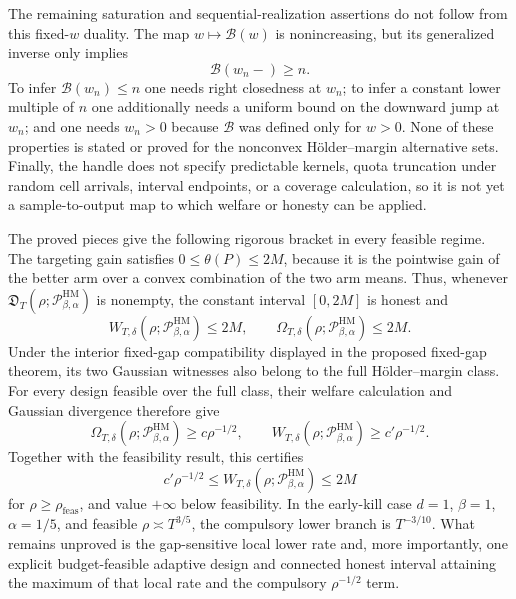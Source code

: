 The remaining saturation and sequential-realization assertions do not follow from this fixed-\(w\) duality.  The map \(w\mapsto\mathcal B(w)\) is nonincreasing, but its generalized inverse only implies
\[
\mathcal B(w_n-)\geq n.
\]
To infer \(\mathcal B(w_n)\leq n\) one needs right closedness at \(w_n\); to infer a constant lower multiple of \(n\) one additionally needs a uniform bound on the downward jump at \(w_n\); and one needs \(w_n>0\) because \(\mathcal B\) was defined only for \(w>0\).  None of these properties is stated or proved for the nonconvex H\"older--margin alternative sets.  Finally, the handle does not specify predictable kernels, quota truncation under random cell arrivals, interval endpoints, or a coverage calculation, so it is not yet a sample-to-output map to which welfare or honesty can be applied.

The proved pieces give the following rigorous bracket in every feasible regime.  The targeting gain satisfies \(0\leq\theta(P)\leq2M\), because it is the pointwise gain of the better arm over a convex combination of the two arm means.  Thus, whenever \(\mathfrak D_T(\rho;\mathcal P_{\beta,\alpha}^{\mathrm{HM}})\) is nonempty, the constant interval \([0,2M]\) is honest and
\[
W_{T,\delta}(\rho;\mathcal P_{\beta,\alpha}^{\mathrm{HM}})\leq2M,
\qquad
\Omega_{T,\delta}(\rho;\mathcal P_{\beta,\alpha}^{\mathrm{HM}})\leq2M.
\]
Under the interior fixed-gap compatibility displayed in the proposed fixed-gap theorem, its two Gaussian witnesses also belong to the full H\"older--margin class.  For every design feasible over the full class, their welfare calculation and Gaussian divergence therefore give
\[
\Omega_{T,\delta}(\rho;\mathcal P_{\beta,\alpha}^{\mathrm{HM}})
\geq c\rho^{-1/2},
\qquad
W_{T,\delta}(\rho;\mathcal P_{\beta,\alpha}^{\mathrm{HM}})
\geq c'\rho^{-1/2}.
\]
Together with the feasibility result, this certifies
\[
c'\rho^{-1/2}\leq W_{T,\delta}(\rho;\mathcal P_{\beta,\alpha}^{\mathrm{HM}})\leq2M
\]
for \(\rho\geq\rho_{\mathrm{feas}}\), and value \(+\infty\) below feasibility.  In the early-kill case \(d=1\), \(\beta=1\), \(\alpha=1/5\), and feasible \(\rho\asymp T^{3/5}\), the compulsory lower branch is \(T^{-3/10}\).  What remains unproved is the gap-sensitive local lower rate and, more importantly, one explicit budget-feasible adaptive design and connected honest interval attaining the maximum of that local rate and the compulsory \(\rho^{-1/2}\) term.
